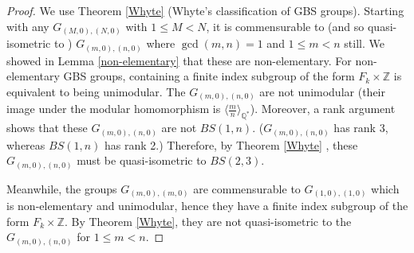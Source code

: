 \documentclass[10pt]{article}
\def\integers{{\mathbb{Z}}}
\def\rationals{{\mathbb Q}}
\theoremstyle{definition}
\begin{document}
\begin{proof}
We use Theorem \ref{Whyte} (Whyte's classification of GBS groups).  Starting with any $G_{(M,0),(N,0)}$ with $1 \leq M<N$, it is commensurable to (and so quasi-isometric to ) $G_{(m,0),(n,0)}$ where $\gcd(m,n)=1$ and $1\leq m<n$ still. We showed in Lemma \ref{non-elementary} that these are non-elementary. For non-elementary GBS groups, containing a finite index subgroup of the form $F_{k} \times \integers$ is equivalent to being unimodular. The $G_{(m,0),(n,0)}$ are not unimodular (their image under the modular homomorphism is $\langle \frac{m}{n} \rangle_{\rationals^*}$). Moreover, a rank argument shows that these $G_{(m,0),(n,0)}$ are not $BS(1,n)$. ($G_{(m,0),(n,0)}$ has rank 3, whereas $BS(1,n)$ has rank 2.) Therefore, by Theorem \ref{Whyte} , these $G_{(m,0),(n,0)}$ must be quasi-isometric to $BS(2,3)$.

Meanwhile, the groups $G_{(m,0),(m,0)}$ are commensurable to $G_{(1,0),(1,0)}$ which is non-elementary and unimodular, hence they have a finite index subgroup of the form $F_k \times \integers$. By Theorem \ref{Whyte}, they are not quasi-isometric to the $G_{(m,0),(n,0)}$ for $1 \leq m < n$.  
\end{proof}
\end{document}
